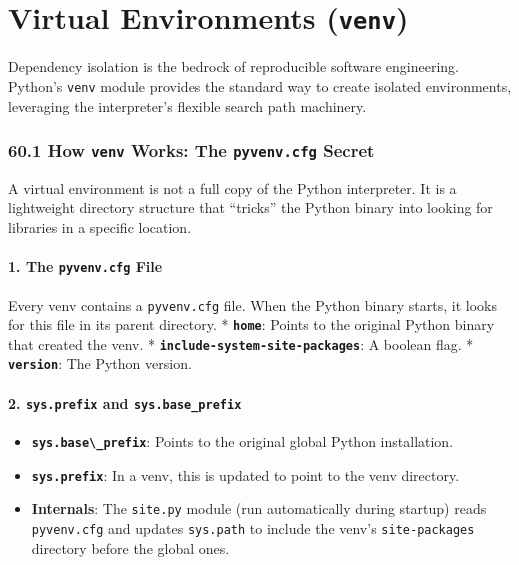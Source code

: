 \hypertarget{virtual-environments-venv}{%
\chapter{\texorpdfstring{Virtual Environments
(\texttt{venv})}{Virtual Environments (venv)}}\label{virtual-environments-venv}}

Dependency isolation is the bedrock of reproducible software
engineering. Python's \passthrough{\lstinline!venv!} module provides the
standard way to create isolated environments, leveraging the
interpreter's flexible search path machinery.

\hypertarget{how-venv-works-the-pyvenv.cfg-secret}{%
\subsection{\texorpdfstring{60.1 How \texttt{venv} Works: The
\texttt{pyvenv.cfg}
Secret}{60.1 How venv Works: The pyvenv.cfg Secret}}\label{how-venv-works-the-pyvenv.cfg-secret}}

A virtual environment is not a full copy of the Python interpreter. It
is a lightweight directory structure that ``tricks'' the Python binary
into looking for libraries in a specific location.

\hypertarget{the-pyvenv.cfg-file}{%
\subsubsection{\texorpdfstring{1. The \texttt{pyvenv.cfg}
File}{1. The pyvenv.cfg File}}\label{the-pyvenv.cfg-file}}

Every venv contains a \passthrough{\lstinline!pyvenv.cfg!} file. When
the Python binary starts, it looks for this file in its parent
directory. * \textbf{\passthrough{\lstinline!home!}}: Points to the
original Python binary that created the venv. *
\textbf{\passthrough{\lstinline!include-system-site-packages!}}: A
boolean flag. * \textbf{\passthrough{\lstinline!version!}}: The Python
version.

\hypertarget{sys.prefix-and-sys.base_prefix}{%
\subsubsection{\texorpdfstring{2. \texttt{sys.prefix} and
\texttt{sys.base\_prefix}}{2. sys.prefix and sys.base\_prefix}}\label{sys.prefix-and-sys.base_prefix}}

\begin{itemize}
\tightlist
\item
  \textbf{\passthrough{\lstinline!sys.base\_prefix!}}: Points to the
  original global Python installation.
\item
  \textbf{\passthrough{\lstinline!sys.prefix!}}: In a venv, this is
  updated to point to the venv directory.
\item
  \textbf{Internals}: The \passthrough{\lstinline!site.py!} module (run
  automatically during startup) reads
  \passthrough{\lstinline!pyvenv.cfg!} and updates
  \passthrough{\lstinline!sys.path!} to include the venv's
  \passthrough{\lstinline!site-packages!} directory before the global
  ones.
\end{itemize}

